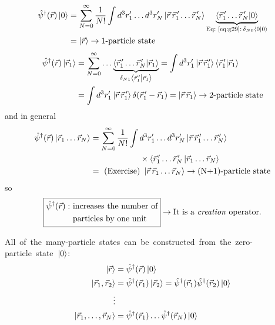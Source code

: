 \documentclass[12pt]{article}
\newcommand{\be}{\begin{equation}}
\newcommand{\ee}{\end{equation}}
\begin{document}
\be
\begin{aligned}
\hat{\psi}^{\dagger}(\vec{r})\ket{0}
&=\sum_{N=0}^{\infty} \frac{1}{N !} \int d^{3} r_{1}^\prime \ldots d^{3} r_{N}^\prime \left|\vec{r}\, \vec{r}_{1}^{\,\prime} \ldots \vec{r}_{N}^{\,\prime}\right\rangle
\underbrace{\left\langle\vec{r}_{1}^{\,\prime} \ldots \vec{r}_{N}^{\,\prime}|0\right\rangle}%
_{\text{Eq:~\eqref{eq:g29}}:\,\delta_{N0}\bra{0}\ket{0}}\\
&=\ket{\vec{r}} \to \text{1-particle state}
\end{aligned}
\ee
%
\be
\begin{aligned}
\hat{\psi}^{\dagger}(\vec{r})\ket{\vec{r}_1}
&=\sum_{N=0}^{\infty} \ldots
\underbrace{\left\langle\vec{r}_{1}^{\,\prime} \ldots \vec{r}_{N}^{\,\prime}|\vec{r}_1\right\rangle}%
_{\delta_{N1}\bra{\vec{r}_{1}^{\,\prime}}\ket{\vec{r}_{1}}}
= \int d^{3} r_{1}^\prime \ket{\vec{r}\, \vec{r}_{1}^{\,\prime}}\bra{\vec{r}_{1}^{\,\prime}}\ket{\vec{r}_{1}}\\
&= \int d^{3} r_{1}^\prime \ket{\vec{r}\, \vec{r}_{1}^{\,\prime}}\delta(\vec{r}_{1}^{\,\prime}-\vec{r}_{1})
= \ket{\vec{r}\,\vec{r}_{1}} \to \text{2-particle state}
\end{aligned}
\ee
and in general
\be
\begin{aligned}
\hat{\psi}^{\dagger}(\vec{r})\ket{\vec{r}_1\ldots\vec{r}_N}
&=\sum_{N=0}^{\infty} \frac{1}{N !} \int d^{3} r_{1}^\prime \ldots d^{3} r_{N}^\prime \left|\vec{r}\, \vec{r}_{1}^{\,\prime} \ldots \vec{r}_{N}^{\,\prime}\right\rangle\\
&\hspace{6em}\times\langle\vec{r}_{1}^{\,\prime} \ldots \vec{r}_{N}^{\,\prime}\ket{\vec{r}_1\ldots\vec{r}_N}\\%
&= \text{ (Exercise) }\ket{\vec{r}\,\vec{r}_1\ldots\vec{r}_N} \to \text{(N+1)-particle state}
\end{aligned}
\ee
so
\[
\boxed{
\begin{aligned}
\hat{\psi}^{\dagger}(\vec{r}):
&\text{ increases the number of}\\
&\text{ particles by one unit}
\end{aligned}
}\rightarrow \text{It is a \emph{creation} operator.}
\]

\mbox{All of the many-particle states can be constructed
from the zero-particle state $\ket{0}$:}
\begin{align}
\ket{\vec{r}} &= \hat{\psi}^\dagger(\vec{r})\ket{0}\\
\ket{\vec{r}_1,\vec{r}_2} &= \hat{\psi}^\dagger(\vec{r}_1)\ket{\vec{r}_2} = 
\hat{\psi}^\dagger(\vec{r}_1)\hat{\psi}^\dagger(\vec{r}_2)\ket{0}\\
\vdots\nonumber\\
\ket{\vec{r}_1,\ldots,\vec{r}_N} &= \hat{\psi}^\dagger(\vec{r}_1)\ldots\hat{\psi}^\dagger(\vec{r}_N)\ket{0}
\end{align}
\end{document}

